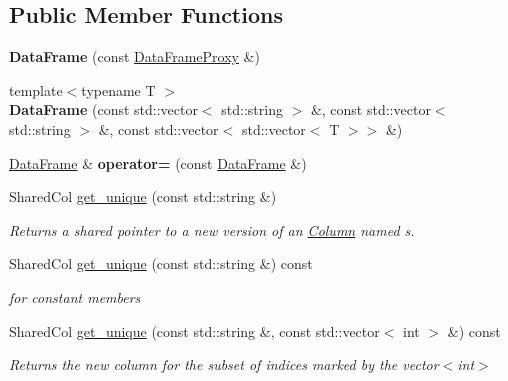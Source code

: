 \subsection*{Public Member Functions}
\begin{DoxyCompactItemize}
\item 
\mbox{\label{classDataFrame_a1f727e3248f4a7cc83f1fbcc10246302}} 
{\bfseries Data\+Frame} (const \hyperlink{classDataFrame_1_1DataFrameProxy}{Data\+Frame\+Proxy} \&)
\item 
\mbox{\label{classDataFrame_a8be8d03b97170a3fcca49dff7e4b7f16}} 
{\footnotesize template$<$typename T $>$ }\\{\bfseries Data\+Frame} (const std\+::vector$<$ std\+::string $>$ \&, const std\+::vector$<$ std\+::string $>$ \&, const std\+::vector$<$ std\+::vector$<$ T $>$$>$ \&)
\item 
\mbox{\label{classDataFrame_a8bd3fc8f384de88dbb35347c220f2d94}} 
\hyperlink{classDataFrame}{Data\+Frame} \& {\bfseries operator=} (const \hyperlink{classDataFrame}{Data\+Frame} \&)
\item 
Shared\+Col \hyperlink{classDataFrame_a5909652f24e66c22922b4b4c910f2b09}{get\+\_\+unique} (const std\+::string \&)
\begin{DoxyCompactList}\small\item\em Returns a shared pointer to a new version of an \hyperlink{classColumn}{Column} named s. \end{DoxyCompactList}\item 
\mbox{\label{classDataFrame_afa835fbc006732850a6483ba8635db2e}} 
Shared\+Col \hyperlink{classDataFrame_afa835fbc006732850a6483ba8635db2e}{get\+\_\+unique} (const std\+::string \&) const
\begin{DoxyCompactList}\small\item\em for constant members \end{DoxyCompactList}\item 
\mbox{\label{classDataFrame_a6602096fc3d63c1211b25a31a802a504}} 
Shared\+Col \hyperlink{classDataFrame_a6602096fc3d63c1211b25a31a802a504}{get\+\_\+unique} (const std\+::string \&, const std\+::vector$<$ int $>$ \&) const
\begin{DoxyCompactList}\small\item\em Returns the new column for the subset of indices marked by the vector$<$int$>$ \end{DoxyCompactList}\item 
$$
\end{DoxyCompactItemize}

